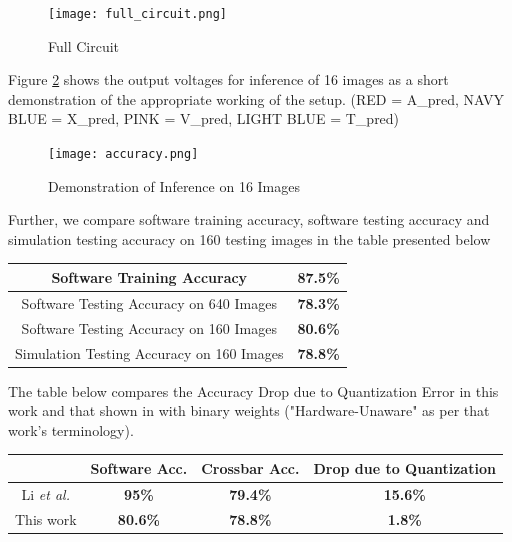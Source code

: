 \documentclass[conference]{IEEEtran}  %
\begin{document}
\begin{figure}[h]
    \centering
    \texttt{[image: full\_circuit.png]}
    \caption{Full Circuit}
    \label{fig:7}
\end{figure}

Figure \ref{fig:8} shows the output voltages for inference of 16 images as a short demonstration of the appropriate working of the setup. (RED = A\_pred, NAVY BLUE = X\_pred, PINK = V\_pred, LIGHT BLUE = T\_pred)

\begin{figure}[h]
    \centering
    \texttt{[image: accuracy.png]}
    \caption{Demonstration of Inference on 16 Images}
    \label{fig:8}
\end{figure}

Further, we compare software training accuracy, software testing accuracy and simulation testing accuracy on 160 testing images in the table presented below

\renewcommand{\arraystretch}{1.3} %
\setlength{\tabcolsep}{6pt}       %

\begin{table}[h]
    \centering
    \begin{tabular}{|c|c|}\hline
        Software Training Accuracy &  \textbf{87.5\%} \\ \hline
        Software Testing Accuracy on 640 Images & \textbf{78.3\%} \\ \hline
        Software Testing Accuracy on 160 Images & \textbf{80.6\%} \\ \hline
        Simulation Testing Accuracy on 160 Images & \textbf{78.8\%}\\ \hline
    \end{tabular}
\end{table}

The table below compares the Accuracy Drop due to Quantization Error in this work and that shown in \cite{b1} with binary weights ("Hardware-Unaware" as per that work's terminology).

\renewcommand{\arraystretch}{1.3} %
\setlength{\tabcolsep}{4pt}       %

\begin{table}[h]
    \centering
    \begin{tabular}{|c|c|c|c|}\hline
         ~ & Software Acc. & Crossbar Acc. & Drop due to Quantization\\ \hline
         Li \textit{et al.} \cite{b1} & \textbf{95\%} & \textbf{79.4\%}&\textbf{15.6\%}\\ \hline
         This work & \textbf{80.6\%}&\textbf{78.8\%} & \textbf{1.8\%}\\ \hline
    \end{tabular}
\end{table}
\end{document}
